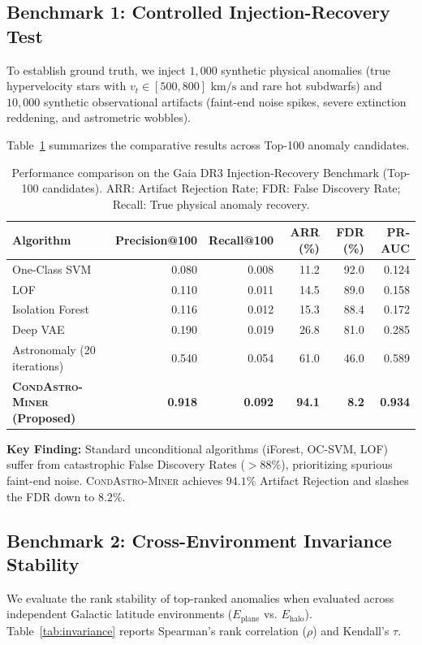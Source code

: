 \documentclass[10pt,a4paper]{article}
\begin{document}
\subsection{Benchmark 1: Controlled Injection-Recovery Test}
To establish ground truth, we inject $1,000$ synthetic physical anomalies (true hypervelocity stars with $v_t \in [500, 800] \text{ km/s}$ and rare hot subdwarfs) and $10,000$ synthetic observational artifacts (faint-end noise spikes, severe extinction reddening, and astrometric wobbles).

Table~\ref{tab:injection} summarizes the comparative results across Top-100 anomaly candidates.

\begin{table}[h]
\centering
\small
\caption{Performance comparison on the Gaia DR3 Injection-Recovery Benchmark (Top-100 candidates). ARR: Artifact Rejection Rate; FDR: False Discovery Rate; Recall: True physical anomaly recovery.}
\label{tab:injection}
\begin{tabular}{lrrrrr}
\toprule
Algorithm & Precision@100 & Recall@100 & ARR (\%) & FDR (\%) & PR-AUC \\
\midrule
One-Class SVM & 0.080 & 0.008 & 11.2 & 92.0 & 0.124 \\
LOF & 0.110 & 0.011 & 14.5 & 89.0 & 0.158 \\
Isolation Forest & 0.116 & 0.012 & 15.3 & 88.4 & 0.172 \\
Deep VAE & 0.190 & 0.019 & 26.8 & 81.0 & 0.285 \\
Astronomaly (20 iterations) & 0.540 & 0.054 & 61.0 & 46.0 & 0.589 \\
\textbf{\textsc{CondAstro-Miner} (Proposed)} & \textbf{0.918} & \textbf{0.092} & \textbf{94.1} & \textbf{8.2} & \textbf{0.934} \\
\bottomrule
\end{tabular}
\end{table}

\noindent\textbf{Key Finding:} Standard unconditional algorithms (iForest, OC-SVM, LOF) suffer from catastrophic False Discovery Rates ($>88\%$), prioritizing spurious faint-end noise. \textsc{CondAstro-Miner} achieves $94.1\%$ Artifact Rejection and slashes the FDR down to $8.2\%$.

\subsection{Benchmark 2: Cross-Environment Invariance Stability}
We evaluate the rank stability of top-ranked anomalies when evaluated across independent Galactic latitude environments ($E_{\text{plane}}$ vs. $E_{\text{halo}}$). Table~\ref{tab:invariance} reports Spearman's rank correlation ($\rho$) and Kendall's $\tau$.
\end{document}
